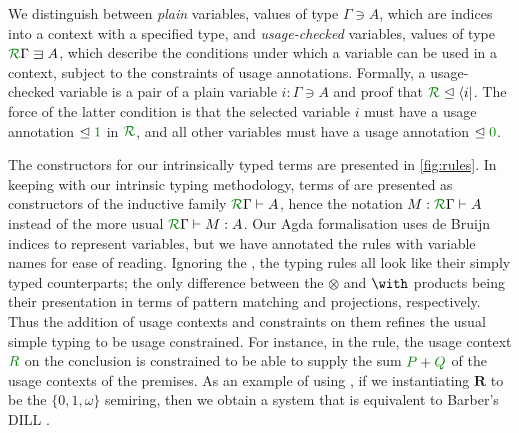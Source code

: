 \documentclass[submission,copyright,creativecommons]{eptcs}
\begin{document}
We distinguish between \emph{plain} variables, values of type
$\Gamma \ni A$, which are indices into a context with a specified
type, and \emph{usage-checked} variables, values of type
$\ctx{\Gamma}{R} \lvar A$, which describe the conditions under which a
variable can be used in a context, subject to the constraints of usage
annotations. Formally, a usage-checked variable is a pair of a plain
variable $i : \Gamma \ni A$ and proof that
$\resctx R \subres \langle i \rvert$. The force of the latter
condition is that the selected variable $i$ must have a usage
annotation $\subres \rescomment 1$ in $\resctx{R}$, and all other
variables must have a usage annotation $\subres \rescomment 0$.




The constructors for our intrinsically typed terms are presented in \autoref{fig:rules}.
In keeping with our intrinsic typing methodology, terms of \name{} are presented as constructors of the inductive family $\ctx\Gamma{R} \vdash A$, hence the notation $M : \ctx\Gamma{R} \vdash A$ instead of the more usual $\ctx\Gamma{R} \vdash M : A$. 
Our Agda formalisation uses de Bruijn indices to represent variables, but we have annotated the rules with variable names for ease of reading. 
Ignoring the , the typing rules all look like their
simply typed counterparts; the only difference between the $\otimes$
and $\with$ products being their presentation in terms of pattern
matching and projections, respectively.
Thus the addition of usage contexts and constraints on them refines the usual simple typing to be usage constrained.
For instance, in the  rule, the usage context $\rescomment R$ on the conclusion is constrained to be able to supply the sum $\rescomment P + \rescomment Q$ of the usage contexts of the premises.
As an example of using \name{}, if we instantiating $\mathbf R$ to be the $\{0, 1, \omega\}$ semiring, then we obtain a system that is equivalent to Barber's DILL \cite{Barber1996}.
\end{document}
